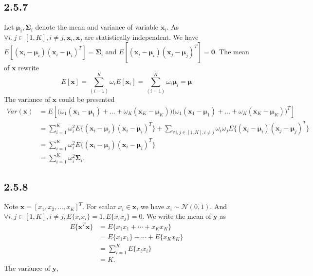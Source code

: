 \documentclass[a4paper, 11pt]{article}
\begin{document}
\subsection{2.5.7}
Let $\boldsymbol{\mu}_i, \boldsymbol{\Sigma}_i$ denote the mean and variance of variable $\mathbf{x}_i$. As $\forall i,j\in[1,K], i\neq j, \mathbf{x}_i,\mathbf{x}_j$ are statistically independent. We have $E[(\mathbf{x}_i-\boldsymbol{\mu}_i)(\mathbf{x}_i-\boldsymbol{\mu}_i)^T] =\boldsymbol{\Sigma}_i $ and $E[(\mathbf{x}_i-\boldsymbol{\mu}_i)(\mathbf{x}_j-\boldsymbol{\mu}_j)^T] =\mathbf{0}$.
The mean of $\mathbf{x}$ rewrite 
\begin{equation*}
    E[\mathbf{x}] = \sum_{(i=1)}^K \omega_i E[\mathbf{x}_i] = \sum_{(i=1)}^K \omega_i\boldsymbol{\mu}_i = \boldsymbol{\mu}
\end{equation*}
The variance of $\mathbf{x}$ could be presented
\begin{equation*}
\begin{split}
     Var(\mathbf{x}) &  = E[\big(\omega_1(\mathbf{x}_1-\boldsymbol{\mu}_1)+\dots+\omega_K(\mathbf{x}_K-\boldsymbol{\mu}_K)\big)\big(\omega_1(\mathbf{x}_1-\boldsymbol{\mu}_1)+\dots+\omega_K(\mathbf{x}_K-\boldsymbol{\mu}_K)\big)^T]\\
     & = \sum_{i=1}^K\omega_i^2E\{(\mathbf{x}_i-\boldsymbol{\mu}_i)(\mathbf{x}_i-\boldsymbol{\mu}_i)^T\}+\sum_{\forall i,j\in [1,K],i\neq j}\omega_i\omega_jE\{(\mathbf{x}_i-\boldsymbol{\mu}_i)(\mathbf{x}_j-\boldsymbol{\mu}_j)^T\} \\
     & = \sum_{i=1}^K\omega_i^2E\{(\mathbf{x}_i-\boldsymbol{\mu}_i)(\mathbf{x}_i-\boldsymbol{\mu}_i)^T\} \\
     & = \sum_{i=1}^K\omega_i^2\boldsymbol{\Sigma}_i.
\end{split}   
\end{equation*}



\subsection{2.5.8}
Note $\mathbf{x}=[x_1,x_2,\dots,x_K]^T$. For scalar $x_i\in\mathbf{x}$, we have $x_i\sim \mathcal{N}(0,1)$. And $\forall i,j\in[1,K],i\neq j,E\{x_ix_i\}=1,E\{x_ix_j\}=0 $. We write the mean of $\mathbf{y}$ as
\begin{equation*}
\begin{split}
     E\{\mathbf{x}^T\mathbf{x}\} &= E\{x_1x_1+\cdots+ x_Kx_K\}\\
     & =  E\{x_1x_1\}+  \cdots + E\{x_Kx_K\} \\
     & = \sum_{i=1}^K E\{x_ix_i\} \\
     & = K.
\end{split}
\end{equation*}
The variance of  $\mathbf{y}$,
\end{document}
